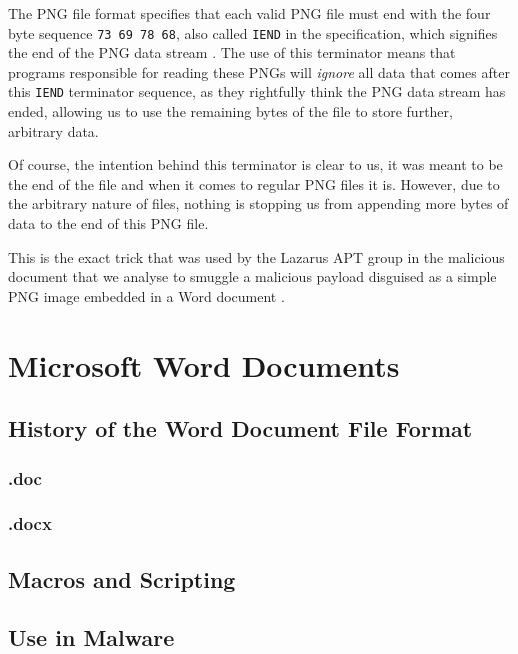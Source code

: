 The \acrshort{PNG} file format specifies that each valid \acrshort{PNG} file must end with the four byte sequence 
\verb+73 69 78 68+, also called \verb+IEND+ in the specification, which signifies the end of the PNG data stream 
\cite{png-standard}. The use of this terminator means that programs responsible for reading these \acrshort{PNG}s 
will \emph{ignore} all data that comes after this \verb+IEND+ terminator sequence, as they rightfully think the
\acrshort{PNG} data stream has ended, allowing us to use the remaining bytes of the file to store further,
arbitrary data. 

Of course, the intention behind this terminator is clear to us, it was meant to be the end of the file and when it comes
to regular \acrshort{PNG} files it is. However, due to the arbitrary nature of files, nothing is stopping us from 
appending more bytes of data to the end of this \acrshort{PNG} file.

This is the exact trick that was used by the Lazarus \acrshort{APT} group in the malicious document that we analyse to
smuggle a malicious payload disguised as a simple \acrshort{PNG} image embedded in a Word document \cite{jazi-article}.

\section{Microsoft Word Documents}

\subsection{History of the Word Document File Format}
\subsubsection{.doc}
\subsubsection{.docx}
\subsection{Macros and Scripting}
\subsection{Use in Malware}


